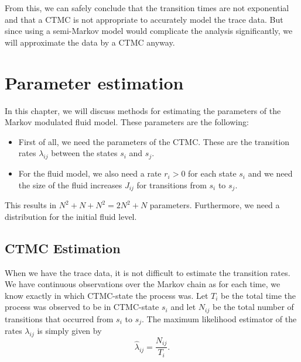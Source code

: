 \documentclass[a4paper]{thesis}
\theoremstyle{definition}
\begin{document}
\begin{figure}[H]
\end{figure}
From this, we can safely conclude that the transition times are not exponential and that a CTMC is not appropriate to accurately model the trace data.
But since using a semi-Markov model would complicate the analysis significantly, we will approximate the data by a CTMC anyway.  
\chapter{Parameter estimation}\label{chapter:ParameterEstimation}
In this chapter, we will discuss methods for estimating the parameters of the Markov modulated fluid model.
These parameters are the following:
\begin{itemize}
	\item First of all, we need the parameters of the CTMC.
	These are the transition rates $\lambda_{ij}$ between the states $s_i$ and $s_j$.
	\item For the fluid model, we also need a rate $r_i>0$ for each state $s_i$ and we need the size of the fluid increases $J_{ij}$ for transitions from $s_i$ to $s_j$. 
\end{itemize}
This results in $N^2+N+N^2=2N^2+N$ parameters.
Furthermore, we need a distribution for the initial fluid level.
\section{CTMC Estimation}
When we have the trace data, it is not difficult to estimate the transition rates.
We have continuous observations over the Markov chain as for each time, we know exactly in which CTMC-state the process was.
Let $T_i$ be the total time the process was observed to be in CTMC-state $s_i$ and let $N_{ij}$ be the total number of transitions that occurred from $s_i$ to $s_j$.
The maximum likelihood estimator of the rates $\lambda_{ij}$ is simply given by \cite{Inamura2006}
\[
\hat\lambda_{ij}=\frac{N_{ij}}{T_i}.
\]
\end{document}
